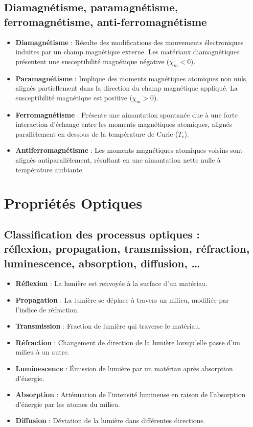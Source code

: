 \documentclass{article}
\begin{document}
    \subsection{Diamagnétisme, paramagnétisme, ferromagnétisme, anti-ferromagnétisme}
    \begin{itemize}
        \item \textbf{Diamagnétisme} : Résulte des modifications des mouvements électroniques induites par un champ magnétique externe. Les matériaux diamagnétiques présentent une susceptibilité magnétique négative (\(\chi_m < 0\)).
        \item \textbf{Paramagnétisme} : Implique des moments magnétiques atomiques non nuls, alignés partiellement dans la direction du champ magnétique appliqué. La susceptibilité magnétique est positive (\(\chi_m > 0\)).
        \item \textbf{Ferromagnétisme} : Présente une aimantation spontanée due à une forte interaction d'échange entre les moments magnétiques atomiques, alignés parallèlement en dessous de la température de Curie (\(T_c\)).
        \item \textbf{Antiferromagnétisme} : Les moments magnétiques atomiques voisins sont alignés antiparallèlement, résultant en une aimantation nette nulle à température ambiante.
    \end{itemize}

\section{Propriétés Optiques}
    \subsection{Classification des processus optiques : réflexion, propagation, transmission, réfraction, luminescence, absorption, diffusion, …}
    \begin{itemize}
        \item \textbf{Réflexion} : La lumière est renvoyée à la surface d'un matériau.
        \item \textbf{Propagation} : La lumière se déplace à travers un milieu, modifiée par l'indice de réfraction.
        \item \textbf{Transmission} : Fraction de lumière qui traverse le matériau.
        \item \textbf{Réfraction} : Changement de direction de la lumière lorsqu'elle passe d'un milieu à un autre.
        \item \textbf{Luminescence} : Émission de lumière par un matériau après absorption d'énergie.
        \item \textbf{Absorption} : Atténuation de l'intensité lumineuse en raison de l'absorption d'énergie par les atomes du milieu.
        \item \textbf{Diffusion} : Déviation de la lumière dans différentes directions.
    \end{itemize}
    
\end{document}
